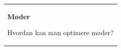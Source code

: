 %
\begin{titlepage}
\vspace*{\fill}
  \addtolength{\hoffset}{0.5\evensidemargin-0.5\oddsidemargin} %
  \noindent%
  {\color{white}\colorbox{aaublue}{\begin{tabular}{@{}p{\textwidth}@{}}
    \begin{center}
    \Huge{\textbf{
      Møder%
    }}
    \end{center}
    \begin{center}
      \Large{
        Hvordan kan man optimere møder? %
}
\end{center}
\end{tabular}}}
\end{titlepage}
